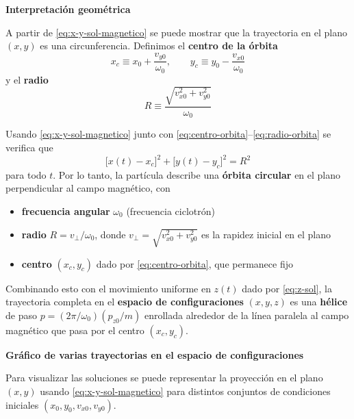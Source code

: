 \documentclass{article}
\begin{document}
\textcolor{trueblue}{\textbf{Interpretación geométrica}}

A partir de \eqref{eq:x-y-sol-magnetico} se puede mostrar que la trayectoria en
el plano $(x,y)$ es una circunferencia. Definimos el
\textcolor{Tarawera}{\textbf{centro de la órbita}}
\begin{equation}
x_{c} \equiv x_{0} + \frac{v_{y0}}{\omega_{0}},
\qquad
y_{c} \equiv y_{0} - \frac{v_{x0}}{\omega_{0}}
\label{eq:centro-orbita}
\end{equation}
y el \textcolor{Cinnabar}{\textbf{radio}}
\begin{equation}
R \equiv \frac{\sqrt{v_{x0}^{2}+v_{y0}^{2}}}{\omega_{0}}
\label{eq:radio-orbita}
\end{equation}

Usando \eqref{eq:x-y-sol-magnetico} junto con
\eqref{eq:centro-orbita}–\eqref{eq:radio-orbita} se verifica que
\begin{equation}
\bigl[x(t)-x_{c}\bigr]^{2} + \bigl[y(t)-y_{c}\bigr]^{2} = R^{2}
\label{eq:circulo-magnetico}
\end{equation}
para todo $t$. Por lo tanto, la partícula describe una
\textbf{órbita circular} en el plano perpendicular al campo magnético, con

\begin{itemize}
  \item[$\bullet$] \textbf{frecuencia angular} $\omega_{0}$ (frecuencia ciclotrón)
  \item[$\bullet$] \textbf{radio} $R = v_{\perp}/\omega_{0}$, donde
    $v_{\perp} = \sqrt{v_{x0}^{2}+v_{y0}^{2}}$ es la rapidez inicial en el plano
  \item[$\bullet$] \textbf{centro} $(x_{c},y_{c})$ dado por
    \eqref{eq:centro-orbita}, que permanece fijo
\end{itemize}

Combinando esto con el movimiento uniforme en $z(t)$ dado por
\eqref{eq:z-sol}, la trayectoria completa en el \textbf{espacio de
configuraciones} $(x,y,z)$ es una \textbf{hélice} de paso
$p = (2\pi/\omega_{0})(p_{z0}/m)$ enrollada alrededor de la línea paralela al
campo magnético que pasa por el centro $(x_{c},y_{c})$.

\textcolor{trueblue}{\textbf{Gráfico de varias trayectorias en el espacio de configuraciones}}

Para visualizar las soluciones se puede representar la proyección en el plano
$(x,y)$ usando \eqref{eq:x-y-sol-magnetico} para distintos conjuntos de
condiciones iniciales $(x_{0},y_{0},v_{x0},v_{y0})$.  
\end{document}
